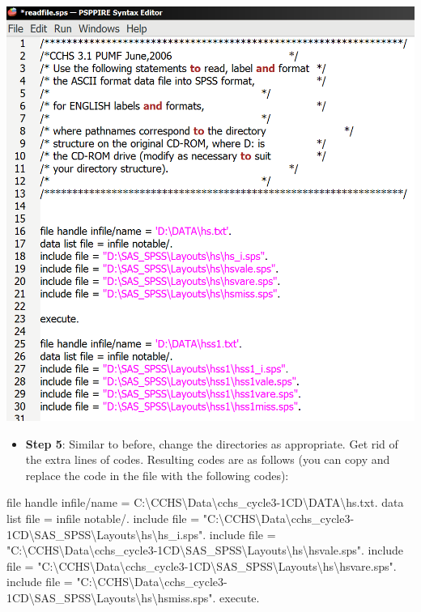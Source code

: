 \documentclass[
]{book}
\newenvironment{Shaded}{\begin{snugshade}}{\end{snugshade}}
\newcommand{\NormalTok}[1]{#1}
\newcommand{\OtherTok}[1]{\textcolor[rgb]{0.56,0.35,0.01}{#1}}
\newcommand{\SpecialCharTok}[1]{\textcolor[rgb]{0.00,0.00,0.00}{#1}}
\newcommand{\StringTok}[1]{\textcolor[rgb]{0.31,0.60,0.02}{#1}}
\providecommand{\tightlist}{%
  \setlength{\itemsep}{0pt}\setlength{\parskip}{0pt}}
\begin{document}
\includegraphics[width=0.65\linewidth]{images/abacusX33}

\begin{itemize}
\tightlist
\item
  \textbf{Step 5}: Similar to before, change the directories as appropriate. Get rid of the extra lines of codes. Resulting codes are as follows (you can copy and replace the code in the file with the following codes):
\end{itemize}

\begin{Shaded}
\begin{Highlighting}[]
\NormalTok{file handle infile}\SpecialCharTok{/}\NormalTok{name }\OtherTok{=} \StringTok{\textquotesingle{}C:\textbackslash{}CCHS\textbackslash{}Data\textbackslash{}cchs\_cycle3{-}1CD\textbackslash{}DATA\textbackslash{}hs.txt\textquotesingle{}}\NormalTok{.}
\NormalTok{data list file }\OtherTok{=}\NormalTok{ infile notable}\SpecialCharTok{/}\NormalTok{.}
\NormalTok{include file }\OtherTok{=} \StringTok{"C:\textbackslash{}CCHS\textbackslash{}Data\textbackslash{}cchs\_cycle3{-}1CD\textbackslash{}SAS\_SPSS\textbackslash{}Layouts\textbackslash{}hs\textbackslash{}hs\_i.sps"}\NormalTok{.}
\NormalTok{include file }\OtherTok{=} \StringTok{"C:\textbackslash{}CCHS\textbackslash{}Data\textbackslash{}cchs\_cycle3{-}1CD\textbackslash{}SAS\_SPSS\textbackslash{}Layouts\textbackslash{}hs\textbackslash{}hsvale.sps"}\NormalTok{.}
\NormalTok{include file }\OtherTok{=} \StringTok{"C:\textbackslash{}CCHS\textbackslash{}Data\textbackslash{}cchs\_cycle3{-}1CD\textbackslash{}SAS\_SPSS\textbackslash{}Layouts\textbackslash{}hs\textbackslash{}hsvare.sps"}\NormalTok{.}
\NormalTok{include file }\OtherTok{=} \StringTok{"C:\textbackslash{}CCHS\textbackslash{}Data\textbackslash{}cchs\_cycle3{-}1CD\textbackslash{}SAS\_SPSS\textbackslash{}Layouts\textbackslash{}hs\textbackslash{}hsmiss.sps"}\NormalTok{.}
\NormalTok{execute.}
\end{Highlighting}
\end{Shaded}
\end{document}
